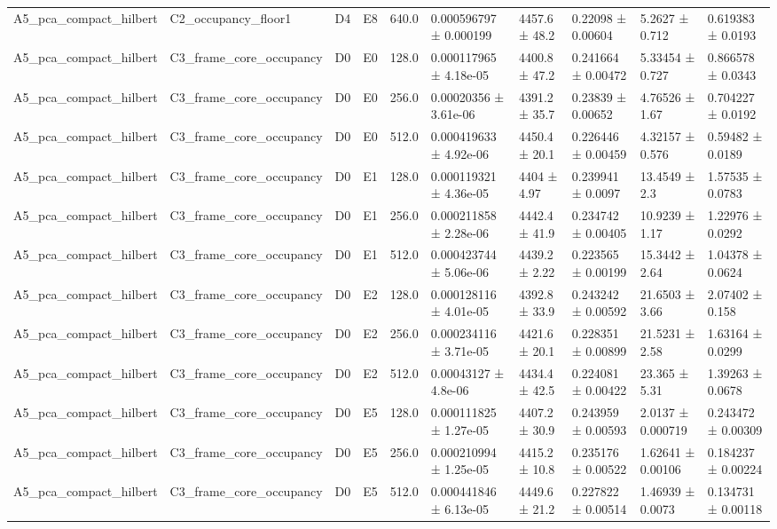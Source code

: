 \begin{table}
\begin{tabular}{llllllllll}
A5\_pca\_compact\_hilbert & C2\_occupancy\_floor1 & D4 & E8 & 640.0 & 0.000596797 ± 0.000199 & 4457.6 ± 48.2 & 0.22098 ± 0.00604 & 5.2627 ± 0.712 & 0.619383 ± 0.0193 \\
A5\_pca\_compact\_hilbert & C3\_frame\_core\_occupancy & D0 & E0 & 128.0 & 0.000117965 ± 4.18e-05 & 4400.8 ± 47.2 & 0.241664 ± 0.00472 & 5.33454 ± 0.727 & 0.866578 ± 0.0343 \\
A5\_pca\_compact\_hilbert & C3\_frame\_core\_occupancy & D0 & E0 & 256.0 & 0.00020356 ± 3.61e-06 & 4391.2 ± 35.7 & 0.23839 ± 0.00652 & 4.76526 ± 1.67 & 0.704227 ± 0.0192 \\
A5\_pca\_compact\_hilbert & C3\_frame\_core\_occupancy & D0 & E0 & 512.0 & 0.000419633 ± 4.92e-06 & 4450.4 ± 20.1 & 0.226446 ± 0.00459 & 4.32157 ± 0.576 & 0.59482 ± 0.0189 \\
A5\_pca\_compact\_hilbert & C3\_frame\_core\_occupancy & D0 & E1 & 128.0 & 0.000119321 ± 4.36e-05 & 4404 ± 4.97 & 0.239941 ± 0.0097 & 13.4549 ± 2.3 & 1.57535 ± 0.0783 \\
A5\_pca\_compact\_hilbert & C3\_frame\_core\_occupancy & D0 & E1 & 256.0 & 0.000211858 ± 2.28e-06 & 4442.4 ± 41.9 & 0.234742 ± 0.00405 & 10.9239 ± 1.17 & 1.22976 ± 0.0292 \\
A5\_pca\_compact\_hilbert & C3\_frame\_core\_occupancy & D0 & E1 & 512.0 & 0.000423744 ± 5.06e-06 & 4439.2 ± 2.22 & 0.223565 ± 0.00199 & 15.3442 ± 2.64 & 1.04378 ± 0.0624 \\
A5\_pca\_compact\_hilbert & C3\_frame\_core\_occupancy & D0 & E2 & 128.0 & 0.000128116 ± 4.01e-05 & 4392.8 ± 33.9 & 0.243242 ± 0.00592 & 21.6503 ± 3.66 & 2.07402 ± 0.158 \\
A5\_pca\_compact\_hilbert & C3\_frame\_core\_occupancy & D0 & E2 & 256.0 & 0.000234116 ± 3.71e-05 & 4421.6 ± 20.1 & 0.228351 ± 0.00899 & 21.5231 ± 2.58 & 1.63164 ± 0.0299 \\
A5\_pca\_compact\_hilbert & C3\_frame\_core\_occupancy & D0 & E2 & 512.0 & 0.00043127 ± 4.8e-06 & 4434.4 ± 42.5 & 0.224081 ± 0.00422 & 23.365 ± 5.31 & 1.39263 ± 0.0678 \\
A5\_pca\_compact\_hilbert & C3\_frame\_core\_occupancy & D0 & E5 & 128.0 & 0.000111825 ± 1.27e-05 & 4407.2 ± 30.9 & 0.243959 ± 0.00593 & 2.0137 ± 0.000719 & 0.243472 ± 0.00309 \\
A5\_pca\_compact\_hilbert & C3\_frame\_core\_occupancy & D0 & E5 & 256.0 & 0.000210994 ± 1.25e-05 & 4415.2 ± 10.8 & 0.235176 ± 0.00522 & 1.62641 ± 0.00106 & 0.184237 ± 0.00224 \\
A5\_pca\_compact\_hilbert & C3\_frame\_core\_occupancy & D0 & E5 & 512.0 & 0.000441846 ± 6.13e-05 & 4449.6 ± 21.2 & 0.227822 ± 0.00514 & 1.46939 ± 0.0073 & 0.134731 ± 0.00118 \\

\end{tabular}
\end{table}
